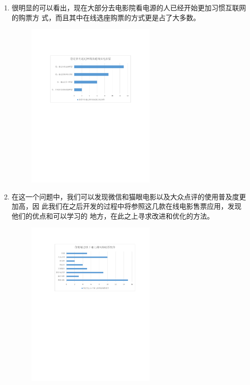 \documentclass[a4paper]{article}
\begin{document}
\begin{enumerate}
\begin{figure}[H]
\end{figure}
  \item 很明显的可以看出，现在大部分去电影院看电源的人已经开始更加习惯互联网的购票方
式，而且其中在线选座购票的方式更是占了大多数。
\begin{figure}[H]
  \centering
  \includegraphics[width=0.6\textwidth]{figure/3.pdf}
\end{figure}
  \item 在这一个问题中，我们可以发现微信和猫眼电影以及大众点评的使用普及度更加高，因
此我们在之后开发的过程中将参照这几款在线电影售票应用，发现他们的优点和可以学习的
地方，在此之上寻求改进和优化的方法。
\begin{figure}[H]
  \centering
  \includegraphics[width=0.6\textwidth]{figure/4.pdf}

\end{figure}
\end{enumerate}
\end{document}
